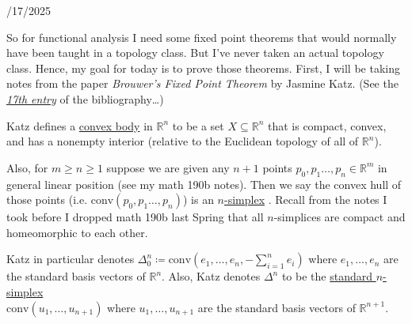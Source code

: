 \documentclass{book}
\newcommand{\inLinkRap}[2]{{\color{blue}\hyperlink{#1}{\textit{#2}}}}
\newcommand{\hTwo}{%
\color{Black}%
   \fontsize{13}{15}\selectfont%
}
\newcommand{\udefine}[1]{{%
   \setulcolor{Red}%
   \setul{0.14em}{0.07em}%
   \ul{#1}%
}}
\newcommand{\conv}{\mathrm{conv}}
\newcommand{\retTwo}{\hfill\bigbreak}
\newcommand{\dispDate}[1]{{
   \color{Black}%
   \fontsize{20}{18}\selectfont%
   #1\retTwo
}}
\begin{document}
\setul{0.14em}{0.07em}
\calibri

\hTwo\dispDate{10/17/2025}

So for functional analysis I need some fixed point theorems that would normally have been taught in a topology class. But I've never taken an actual topology class. Hence, my goal for today is to prove those theorems. First, I will be taking notes from the paper \textit{Brouwer's Fixed Point Theorem} by Jasmine Katz. (See the \inLinkRap{bib citation 17}{17th entry} of the bibliography\dots)\retTwo

Katz defines a \udefine{convex body} in $\mathbb{R}^n$ to be a set $X \subseteq \mathbb{R}^n$ that is compact, convex, and has a nonempty interior (relative to the Euclidean topology of all of $\mathbb{R}^n$).\retTwo

Also, for $m \geq n \geq 1$ suppose we are given any $n + 1$ points $p_0, p_1 \ldots, p_n \in \mathbb{R}^m$ in general linear position (see my math 190b notes). Then we say the convex hull of those points (i.e. $\conv(p_0, p_1 \ldots, p_n)$) is an \udefine{$n$-simplex}. Recall from the notes I took before I dropped math 190b last Spring that all $n$-simplices are compact and homeomorphic to each other.\retTwo

Katz in particular denotes $\Delta_0^n \coloneqq \conv(e_1, \ldots, e_n, -\sum_{i=1}^n e_i)$ where $e_1, \ldots, e_n$ are\\ the standard basis vectors of $\mathbb{R}^n$. Also, Katz denotes $\Delta^n$ to be the \udefine{standard $n$-simplex}\\ $\conv(u_1, \ldots, u_{n+1})$ where $u_1, \ldots, u_{n+1}$ are the standard basis vectors of $\mathbb{R}^{n+1}$.\retTwo
\end{document}
